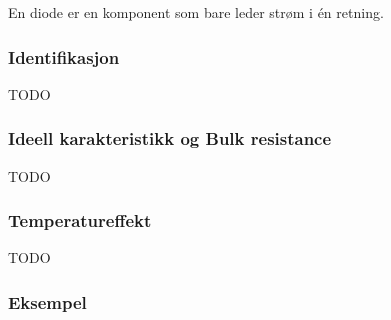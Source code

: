 En diode er en komponent som bare leder strøm i én retning.

\subsubsection{Identifikasjon}
TODO

\subsubsection{Ideell karakteristikk og Bulk resistance}
TODO

\subsubsection{Temperatureffekt}
TODO

\subsubsection{Eksempel}

